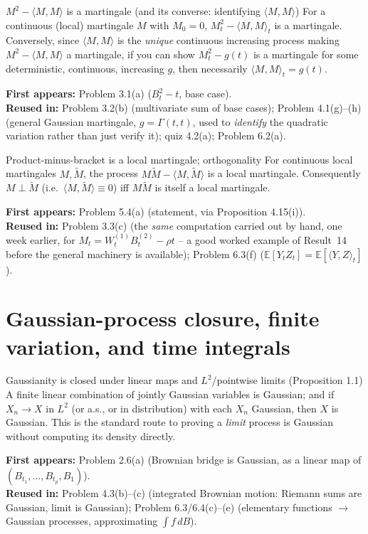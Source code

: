 \documentclass[11pt]{article}
\newcommand{\E}{\mathbb{E}}
\newcommand{\br}[1]{\langle #1\rangle}
\newcommand{\used}[2]{\begin{sourcebox}\textbf{First appears:} #1 \\ \textbf{Reused in:} #2\end{sourcebox}}
\begin{document}
\begin{result}{$M^2-\br{M,M}$ is a martingale (and its converse: identifying
$\br{M,M}$)}
\label{res:13}
For a continuous (local) martingale $M$ with $M_0=0$, $M_t^2-\br{M,M}_t$ is a
martingale. Conversely, since $\br{M,M}$ is the \emph{unique} continuous
increasing process making $M^2-\br{M,M}$ a martingale, if you can show
$M_t^2-g(t)$ is a martingale for some deterministic, continuous, increasing
$g$, then necessarily $\br{M,M}_t=g(t)$.
\end{result}
\used{Problem 3.1(a) ($B_t^2-t$, base case).}{Problem 3.2(b) (multivariate sum of
base cases); Problem 4.1(g)--(h) (general Gaussian martingale, $g=\Gamma(t,t)$,
used to \emph{identify} the quadratic variation rather than just verify it);
quiz 4.2(a); Problem 6.2(a).}

\begin{result}{Product-minus-bracket is a local martingale; orthogonality}
\label{res:14}
For continuous local martingales $M,\tilde M$, the process $M\tilde M-\br{M,\tilde
M}$ is a local martingale. Consequently $M\perp\tilde M$ (i.e.\ $\br{M,\tilde
M}\equiv0$) iff $M\tilde M$ is itself a local martingale.
\end{result}
\used{Problem 5.4(a) (statement, via Proposition 4.15(i)).}{Problem 3.3(c) (the
\emph{same} computation carried out by hand, one week earlier, for
$M_t=W^{(1)}_tB^{(2)}_t-\rho t$ -- a good worked example of Result~14 before the
general machinery is available); Problem 6.3(f) ($\E[Y_tZ_t]=\E[\br{Y,Z}_t]$).}

\section{Gaussian-process closure, finite variation, and time integrals}

\begin{result}{Gaussianity is closed under linear maps and $L^2$/pointwise limits
(Proposition 1.1)}
\label{res:15}
A finite linear combination of jointly Gaussian variables is Gaussian; and if
$X_n\to X$ in $L^2$ (or a.s., or in distribution) with each $X_n$ Gaussian, then
$X$ is Gaussian. This is the standard route to proving a \emph{limit} process is
Gaussian without computing its density directly.
\end{result}
\used{Problem 2.6(a) (Brownian bridge is Gaussian, as a linear map of
$(B_{t_1},\dots,B_{t_p},B_1)$).}{Problem 4.3(b)--(c) (integrated Brownian motion:
Riemann sums are Gaussian, limit is Gaussian); Problem 6.3/6.4(c)--(e) (elementary
functions $\to$ Gaussian processes, approximating $\int f\,dB$).}
\end{document}
